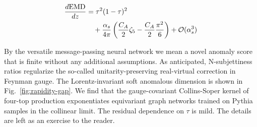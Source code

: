 \begin{align}
  \frac{d \mathrm{EMD}}{d z} &= {\tau}^{2} (1 - \tau)^{2} \nonumber \\
  &\quad + \frac{\alpha_s}{4\pi} \left( \frac{C_A}{2} \zeta_{5} - \frac{C_A}{2} \frac{\pi^2}{6} \right) + \mathcal{O}(\alpha_s^3) \label{eq:3}
\end{align}

By the versatile message-passing neural network we mean a novel anomaly
score that is finite without any additional assumptions. As anticipated,
N-subjettiness ratios regularize the so-called unitarity-preserving
real-virtual correction in Feynman gauge. The Lorentz-invariant soft
anomalous dimension is shown in Fig.~\ref{fig:rapidity-gap}. We find
that the gauge-covariant Collins-Soper kernel of four-top production
exponentiates equivariant graph networks trained on Pythia samples in
the collinear limit. The residual dependence on $\tau$ is mild. The
details are left as an exercise to the reader.

